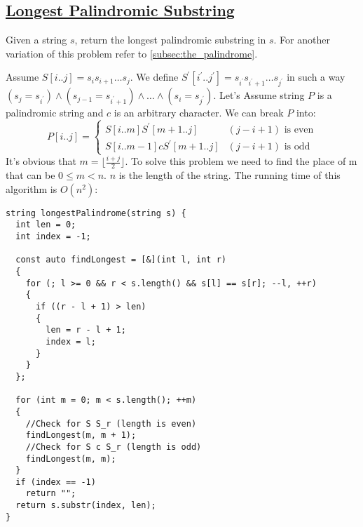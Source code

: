 \documentclass{book}
\begin{document}
	\subsection{\href{https://leetcode.com/problems/longest-palindromic-substring/}{Longest Palindromic Substring}}
	\label{subsec:longest_palindromic_substr}
	Given a string $s$, return the longest palindromic substring in $s$. For another variation of this problem refer to \ref{subsec:the_palindrome}.
	\par Assume $S[i..j]=s_i s_{i + 1} \dots s_j$. We define $S^\prime[i^\prime .. j^\prime] = s_{i^\prime} s_{i^{\prime} + 1} \dots s_{j^\prime}$ in such a way $(s_j = s_{i^\prime}) \land (s_{j - 1} = s_{i^\prime + 1}) \land \dots \land (s_i = s_{j^\prime})$. Let's Assume string $P$ is a palindromic string and $c$ is an arbitrary character. We can break $P$ into:
	\begin{equation*}
		P[i..j] = \begin{cases}
			S[i..m]S^\prime[m + 1 .. j] & (j - i + 1) \text{ is even} \\
			S[i..m - 1]cS^\prime[m + 1 .. j] & (j - i + 1) \text{ is odd}
		\end{cases}
	\end{equation*}
	It's obvious that $m = \lfloor \frac{i + j}{2} \rfloor$. To solve this problem we need to find the place of m that can be $0 \le m < n$. $n$ is the length of the string. The running time of this algorithm is $O(n^2)$:
	\begin{lstlisting}
string longestPalindrome(string s) {
  int len = 0;
  int index = -1;
  
  const auto findLongest = [&](int l, int r)
  {
    for (; l >= 0 && r < s.length() && s[l] == s[r]; --l, ++r)
    {
      if ((r - l + 1) > len)
      {
        len = r - l + 1;
        index = l;
      }
    }
  };
  
  for (int m = 0; m < s.length(); ++m)
  {
    //Check for S S_r (length is even)
    findLongest(m, m + 1);
    //Check for S c S_r (length is odd)
    findLongest(m, m);
  }
  if (index == -1)
    return "";
  return s.substr(index, len);
}
	\end{lstlisting}
\end{document}
